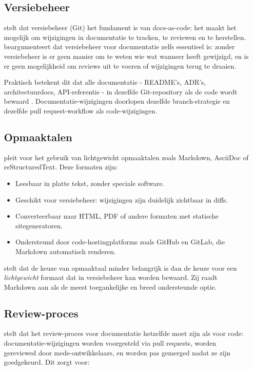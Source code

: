 \subsection{Versiebeheer}
\textcite{gentle2017docslikecode} stelt dat versiebeheer (Git) het fundament is van docs-as-code: het maakt het mogelijk om wijzigingen in documentatie te tracken, te reviewen en te herstellen. \textcite{etter2016moderntechwriting} beargumenteert dat versiebeheer voor documentatie zelfs essentieel is: zonder versiebeheer is er geen manier om te weten wie wat wanneer heeft gewijzigd, en is er geen mogelijkheid om reviews uit te voeren of wijzigingen terug te draaien.

Praktisch betekent dit dat alle documentatie - README's, ADR's, architectuurdocs, API-referentie - in dezelfde Git-repository als de code wordt bewaard \autocite{gentle2017docslikecode}. Documentatie-wijzigingen doorlopen dezelfde branch-strategie en dezelfde pull request-workflow als code-wijzigingen.

\subsection{Opmaaktalen}
\textcite{etter2016moderntechwriting} pleit voor het gebruik van lichtgewicht opmaaktalen zoals Markdown, AsciiDoc of reStructuredText. Deze formaten zijn:
\begin{itemize}
    \item Leesbaar in platte tekst, zonder speciale software.
    \item Geschikt voor versiebeheer: wijzigingen zijn duidelijk zichtbaar in diffs.
    \item Converteerbaar naar HTML, PDF of andere formaten met statische sitegeneratoren.
    \item Ondersteund door code-hostingplatforms zoals GitHub en GitLab, die Markdown automatisch renderen.
\end{itemize}

\textcite{gentle2017docslikecode} stelt dat de keuze van opmaaktaal minder belangrijk is dan de keuze voor een \textit{lichtgewicht} formaat dat in versiebeheer kan worden bewaard. Zij raadt Markdown aan als de meest toegankelijke en breed ondersteunde optie.

\subsection{Review-proces}
\textcite{gentle2017docslikecode} stelt dat het review-proces voor documentatie hetzelfde moet zijn als voor code: documentatie-wijzigingen worden voorgesteld via pull requests, worden gereviewed door mede-ontwikkelaars, en worden pas gemerged nadat ze zijn goedgekeurd. Dit zorgt voor:

